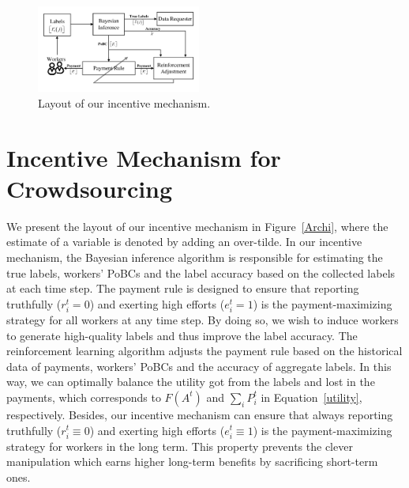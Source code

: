 \begin{figure}[t]
 	\centering
	\includegraphics[width=0.48\textwidth]{image/Architecture}
	\vspace*{-8mm}
    \caption{\label{layout} Layout of our incentive mechanism.}
\end{figure}
\section{Incentive Mechanism for Crowdsourcing}
We present the layout of our incentive mechanism in Figure~\ref{Archi}, where the estimate of a variable is denoted by adding an over-tilde.
In our incentive mechanism, the Bayesian inference algorithm is responsible for estimating the true labels, workers' PoBCs and the label accuracy based on the collected labels at each time step.
The payment rule is designed to ensure that reporting truthfully ($r^{t}_i = 0$) and exerting high efforts ($e^{t}_i=1$) is the payment-maximizing strategy for all workers at any time step.
By doing so, we wish to induce workers to generate high-quality labels and thus improve the label accuracy.
The reinforcement learning algorithm adjusts the payment rule based on the historical data of payments, workers' PoBCs and the accuracy of aggregate labels.
In this way, we can optimally balance the utility got from the labels and lost in the payments, which corresponds to $F(A^t)$ and $\sum_{i}P_i^t$ in Equation~\ref{utility}, respectively.
Besides, our incentive mechanism can ensure that always reporting truthfully ($r^{t}_i \equiv 0$) and exerting high efforts ($e^{t}_i \equiv 1$) is the payment-maximizing strategy for workers in the long term.
This property prevents the clever manipulation which earns higher long-term benefits by sacrificing short-term ones.

